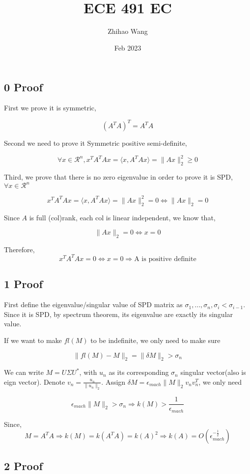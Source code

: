 \documentclass{article}
\title{ECE 491 EC}
\author{Zhihao Wang}
\date{Feb 2023}
\def\implies{\Longrightarrow}
\begin{document}
\maketitle

\subsection*{0 Proof}

First we prove it is symmetric,

$$(A^TA)^T = A^TA$$

Second we need to prove it Symmetric positive semi-definite,

$$\forall x \in \mathcal{R}^n, x^TA^TAx =\langle x, A^TAx \rangle = \| Ax\|_2^2 \ge 0$$

Third, we prove that there is no zero eigenvalue in order to prove it is SPD, $\forall x \in \mathcal{R}^n $

$$x^TA^TAx =\langle x, A^TAx \rangle = \| Ax\|_2^2 = 0 \iff \|Ax \|_2 = 0$$

Since $A$ is full (col)rank, each col is linear independent, we know that,

$$\|Ax \|_2 = 0 \iff x = 0$$

Therefore, 
$$x^TA^TAx = 0 \iff x = 0 \implies \text{A is positive definite}$$


\subsection*{1 Proof}

First define the eigenvalue/singular value of SPD matrix as $\sigma_1, ..., \sigma_n, \sigma_i < \sigma_{i - 1}$. Since it is SPD, by spectrum theorem, its eigenvalue are exactly its singular value. 

If we want to make $fl(M)$ to be indefinite, we only need to make sure 

$$\|fl(M) - M \|_2 = \| \delta M \|_2> \sigma_n$$

We can write $M = U \Sigma U^*$, with $u_n$ as its corresponding $\sigma_n$ singular vector(also is eign vector). Denote $v_n = \frac{u_n}{\|u_n\|_2}$. Assign $\delta M = \epsilon_{mach} \|M \|_2 v_n v_n^T$, we only need

$$\epsilon_{mach} \| M\|_2 > \sigma_n \implies k(M) > \frac{1}{\epsilon_{mach}}$$

Since, 
$$M = A^TA \implies k(M) = k(A^TA) = k(A)^2 \implies k(A) = O(\epsilon_{mach}^{-\frac{1}{2}})$$


\subsection*{2 Proof}
\end{document}
